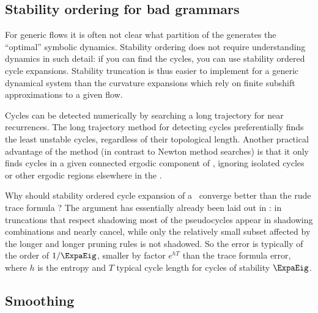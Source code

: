 \subsection{Stability ordering for bad grammars}

For generic flows it is often not clear what
partition of the {\statesp} generates the ``optimal''
symbolic dynamics.  Stability ordering
does not require understanding dynamics in such detail:
if you can find the cycles, you can use
stability ordered cycle expansions.
Stability truncation
is thus
easier to implement for
a generic dynamical system than the
curvature expansions
which rely on finite subshift approximations
to a given flow.

Cycles can be detected numerically by
searching a long trajectory for near recurrences.
The long trajectory method for detecting cycles
preferentially finds
the least unstable cycles, regardless of their topological length.
Another practical advantage of the method (in contrast to
Newton method searches)
is that it only finds
cycles in a given connected ergodic component of {\statesp},
ignoring  isolated cycles or other ergodic regions
elsewhere in the {\statesp}.

Why should stability ordered cycle expansion of a \dzeta\ converge
better than the rude trace formula
?
The argument has essentially already been laid out in
:
in truncations that respect shadowing most of
the pseudocycles appear in shadowing combinations and nearly cancel,
while only the relatively small subset affected by the longer and
longer pruning rules is not shadowed. So the error is typically
of the order of $1/\ExpaEig$, smaller by factor $e^{hT}$ than the
trace formula
error, where $h$ is the entropy and
$T$ typical cycle length for cycles of stability  $\ExpaEig$.

\subsection{Smoothing}
\label{s-Smoothing}


